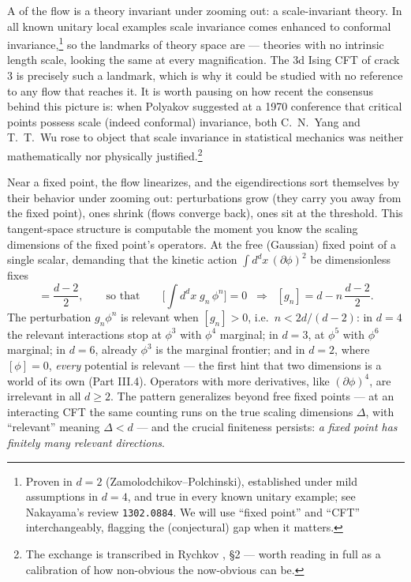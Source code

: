 A  of the flow is a theory invariant under zooming out: a
scale-invariant theory. In all known unitary local examples scale invariance
comes enhanced to conformal invariance,\footnote{Proven in $d=2$
(Zamolodchikov--Polchinski), established under mild assumptions in $d=4$, and
true in every known unitary example; see Nakayama's review \texttt{1302.0884}.
We will use ``fixed point'' and ``CFT'' interchangeably, flagging the
(conjectural) gap when it matters.} so the landmarks of theory space are
 --- theories with no intrinsic length scale,
looking the same at every magnification. The 3d Ising CFT of crack 3 is
precisely such a landmark, which is why it could be studied with no reference to
any flow that reaches it. It is worth pausing on how recent the consensus behind
this picture is: when Polyakov suggested at a 1970 conference that critical
points possess scale (indeed conformal) invariance, both C.~N.~Yang and T.~T.~Wu
rose to object that scale invariance in statistical mechanics was neither
mathematically nor physically justified.\footnote{The exchange is transcribed in
Rychkov , \S2 --- worth reading in full as a calibration of
how non-obvious the now-obvious can be.}

Near a fixed point, the flow linearizes, and the eigendirections sort themselves
by their behavior under zooming out:  perturbations grow (they
carry you away from the fixed point),  ones shrink (flows
converge back),  ones sit at the threshold. This tangent-space
structure is computable the moment you know the scaling dimensions of the fixed
point's operators. At the free (Gaussian) fixed point of a single scalar,
demanding that the kinetic action $\int d^dx\, (\partial\phi)^2$ be
dimensionless fixes
\begin{equation}
[\phi] = \frac{d-2}{2},
\qquad\text{so that}\qquad
\Big[\textstyle\int d^dx\; g_n\, \phi^n\Big] = 0
\;\;\Longrightarrow\;\;
[g_n] = d - n\,\frac{d-2}{2} .
\label{eq:power-counting}
\end{equation}
The perturbation $g_n \phi^n$ is relevant when $[g_n] > 0$, i.e.\ $n <
2d/(d-2)$: in $d = 4$ the relevant interactions stop at $\phi^3$ with $\phi^4$
marginal; in $d = 3$, at $\phi^5$ with $\phi^6$ marginal; in $d = 6$, already
$\phi^3$ is the marginal frontier; and in $d = 2$, where $[\phi] = 0$,
\emph{every} potential is relevant --- the first hint that two dimensions is a
world of its own (Part III.4). Operators with more derivatives, like
$(\partial\phi)^4$, are irrelevant in all $d \geq 2$. The pattern generalizes
beyond free fixed points --- at an interacting CFT the same counting runs on the
true scaling dimensions $\Delta$, with ``relevant'' meaning $\Delta < d$ --- and
the crucial finiteness persists: \emph{a fixed point has finitely many relevant
directions}.

